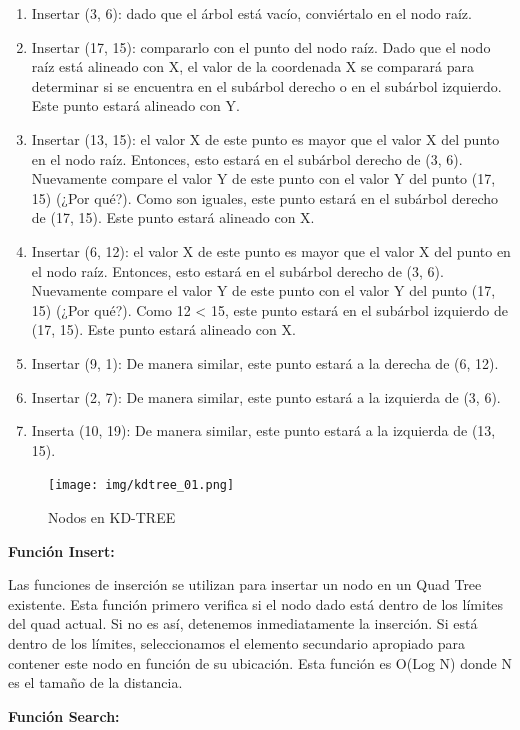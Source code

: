 \documentclass{article}
\begin{document}
\begin{enumerate}
	\item Insertar (3, 6): dado que el árbol está vacío, conviértalo en el nodo raíz.
	\item Insertar (17, 15): compararlo con el punto del nodo raíz. Dado que el nodo raíz está alineado con X, el valor de la coordenada X se comparará para determinar si se encuentra en el subárbol derecho o en el subárbol izquierdo. Este punto estará alineado con Y.
	\item Insertar (13, 15): el valor X de este punto es mayor que el valor X del punto en el nodo raíz. Entonces, esto estará en el subárbol derecho de (3, 6). Nuevamente compare el valor Y de este punto con el valor Y del punto (17, 15) (¿Por qué?). Como son iguales, este punto estará en el subárbol derecho de (17, 15). Este punto estará alineado con X.
	\item Insertar (6, 12): el valor X de este punto es mayor que el valor X del punto en el nodo raíz. Entonces, esto estará en el subárbol derecho de (3, 6). Nuevamente compare el valor Y de este punto con el valor Y del punto (17, 15) (¿Por qué?). Como 12 < 15, este punto estará en el subárbol izquierdo de (17, 15). Este punto estará alineado con X.
	\item Insertar (9, 1): De manera similar, este punto estará a la derecha de (6, 12).
	\item Insertar (2, 7): De manera similar, este punto estará a la izquierda de (3, 6).
	\item Inserta (10, 19): De manera similar, este punto estará a la izquierda de (13, 15).
\end{enumerate}
\begin{figure}[h!]
	\centering
	\texttt{[image: img/kdtree\_01.png]}
	\caption{Nodos en KD-TREE}
	\label{fig:kdtree_01}
\end{figure}

\vspace{5mm}
\textbf{Función Insert:}

Las funciones de inserción se utilizan para insertar un nodo en un Quad Tree existente. Esta función primero verifica si el nodo dado está dentro de los límites del quad actual. Si no es así, detenemos inmediatamente la inserción. Si está dentro de los límites, seleccionamos el elemento secundario apropiado para contener este nodo en función de su ubicación. Esta función es O(Log N) donde N es el tamaño de la distancia.

\vspace{5mm}
\textbf{Función Search:}
\end{document}
